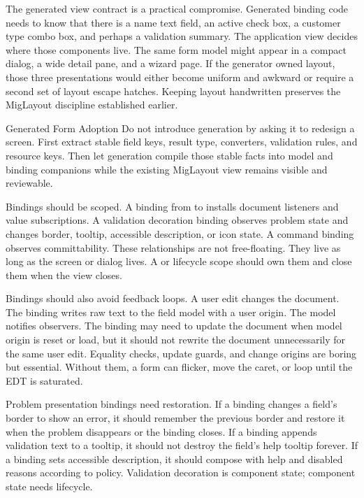 The generated view contract is a practical compromise. Generated binding code
needs to know that there is a name text field, an active check box, a customer
type combo box, and perhaps a validation summary. The application view decides
where those components live. The same form model might appear in a compact
dialog, a wide detail pane, and a wizard page. If the generator owned layout,
those three presentations would either become uniform and awkward or require a
second set of layout escape hatches. Keeping layout handwritten preserves the
MigLayout discipline established earlier.

\begin{migrationbox}{Generated Form Adoption}
Do not introduce generation by asking it to redesign a screen. First extract
stable field keys, result type, converters, validation rules, and resource
keys. Then let generation compile those stable facts into model and binding
companions while the existing MigLayout view remains visible and reviewable.
\end{migrationbox}

Bindings should be scoped. A binding from  to
 installs document listeners and value subscriptions. A
validation decoration binding observes problem state and changes border,
tooltip, accessible description, or icon state. A command binding observes
committability. These relationships are not free-floating. They live as long
as the screen or dialog lives. A  or lifecycle scope should
own them and close them when the view closes.

Bindings should also avoid feedback loops. A user edit changes the document.
The binding writes raw text to the field model with a user origin. The model
notifies observers. The binding may need to update the document when model
origin is reset or load, but it should not rewrite the document unnecessarily
for the same user edit. Equality checks, update guards, and change origins are
boring but essential. Without them, a form can flicker, move the caret, or
loop until the EDT is saturated.

Problem presentation bindings need restoration. If a binding changes a field's
border to show an error, it should remember the previous border and restore it
when the problem disappears or the binding closes. If a binding appends
validation text to a tooltip, it should not destroy the field's help tooltip
forever. If a binding sets accessible description, it should compose with help
and disabled reasons according to policy. Validation decoration is component
state; component state needs lifecycle.

